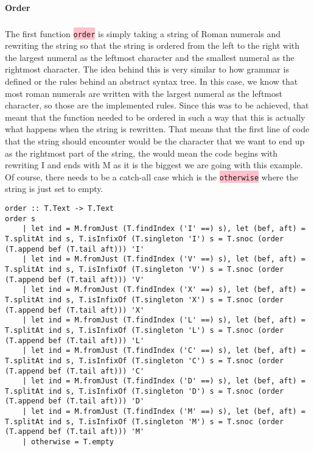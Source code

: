 \documentclass{article}
\begin{document}
\paragraph{Order}

\subparagraph{}

The first function \colorbox{pink}{ \lstinline{order}} is simply taking a string of Roman numerals and rewriting the string so that the string is ordered from the left to the right with the largest numeral as the leftmost character and the smallest numeral as the rightmost character. The idea behind this is very similar to how grammar is defined or the rules behind an abstract syntax tree. In this case, we know that most roman numerals are written with the largest numeral as the leftmost character, so those are the implemented rules. Since this was to be achieved, that meant that the function needed to be ordered in such a way that this is actually what happens when the string is rewritten. That means that the first line of code that the string should encounter would be the character that we want to end up as the rightmost part of the string, the would mean the code begins with rewriting I and ends with M as it is the biggest we are going with this example. Of course, there needs to be a catch-all case which is the \colorbox{pink}{ \lstinline{otherwise}} where the string is just set to empty. 

\begin{lstlisting}
order :: T.Text -> T.Text
order s
    | let ind = M.fromJust (T.findIndex ('I' ==) s), let (bef, aft) = T.splitAt ind s, T.isInfixOf (T.singleton 'I') s = T.snoc (order (T.append bef (T.tail aft))) 'I'
    | let ind = M.fromJust (T.findIndex ('V' ==) s), let (bef, aft) = T.splitAt ind s, T.isInfixOf (T.singleton 'V') s = T.snoc (order (T.append bef (T.tail aft))) 'V'
    | let ind = M.fromJust (T.findIndex ('X' ==) s), let (bef, aft) = T.splitAt ind s, T.isInfixOf (T.singleton 'X') s = T.snoc (order (T.append bef (T.tail aft))) 'X'
    | let ind = M.fromJust (T.findIndex ('L' ==) s), let (bef, aft) = T.splitAt ind s, T.isInfixOf (T.singleton 'L') s = T.snoc (order (T.append bef (T.tail aft))) 'L'
    | let ind = M.fromJust (T.findIndex ('C' ==) s), let (bef, aft) = T.splitAt ind s, T.isInfixOf (T.singleton 'C') s = T.snoc (order (T.append bef (T.tail aft))) 'C'
    | let ind = M.fromJust (T.findIndex ('D' ==) s), let (bef, aft) = T.splitAt ind s, T.isInfixOf (T.singleton 'D') s = T.snoc (order (T.append bef (T.tail aft))) 'D'
    | let ind = M.fromJust (T.findIndex ('M' ==) s), let (bef, aft) = T.splitAt ind s, T.isInfixOf (T.singleton 'M') s = T.snoc (order (T.append bef (T.tail aft))) 'M'
    | otherwise = T.empty
\end{lstlisting}
\end{document}
